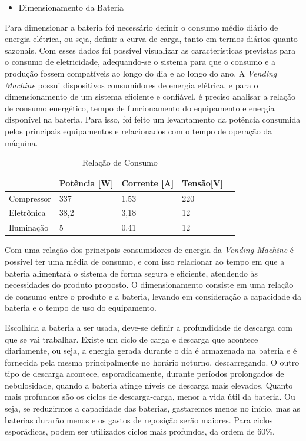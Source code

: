 \begin{itemize}
\item Dimensionamento da Bateria
\end{itemize}

Para dimensionar a bateria foi necessário definir o consumo médio diário de energia elétrica, ou seja, definir a curva de carga, tanto em termos diários quanto sazonais. Com esses dados foi possível visualizar as características previstas para o consumo de eletricidade, adequando-se o sistema para que o consumo e a produção fossem compatíveis ao longo do dia e ao longo do ano.
		A \textit{Vending Machine} possui dispositivos consumidores de energia elétrica, e para o dimensionamento de um sistema eficiente e confiável, é preciso analisar a relação de consumo energético, tempo de funcionamento do equipamento e energia disponível na bateria. Para isso, foi feito um levantamento da potência consumida pelos principais equipamentos e relacionados com o tempo de operação da máquina.

\begin{table}[]
\centering
\caption{Relação de Consumo}
\label{my-label}
\begin{tabular}{|l|l|l|l|l|}
\hline
           & Potência {[}W{]} & Corrente {[}A{]} & Tensão{[}V{]}  \\ \hline
Compressor & 337            & 1,53           & 220           \\ \hline
Eletrônica & 38,2                & 3,18                 &12         \\ \hline
Iluminação & 5            & 0,41            & 12          \\ \hline
\end{tabular}
\end{table}

        Com uma relação dos principais consumidores de energia da \textit{Vending Machine} é possível ter uma média de consumo, e com isso relacionar ao tempo em que a bateria alimentará o sistema de forma segura e eficiente, atendendo às necessidades do produto proposto. O dimensionamento consiste em uma relação de consumo entre o produto e a bateria, levando em consideração a capacidade da bateria e o tempo de uso do equipamento.

		Escolhida a bateria a ser usada, deve-se definir a profundidade de descarga com que se vai trabalhar. Existe um ciclo de carga e descarga que acontece diariamente, ou seja, a energia gerada durante o dia é armazenada na bateria e é fornecida pela mesma principalmente no horário noturno, descarregando. O outro tipo de descarga acontece, esporadicamente, durante períodos prolongados de nebulosidade, quando a bateria atinge níveis de descarga mais elevados.
Quanto mais profundos são os ciclos de descarga-carga, menor a vida útil da bateria. Ou seja, se reduzirmos a capacidade das baterias, gastaremos menos no início, mas as baterias durarão menos e os gastos de reposição serão maiores. Para ciclos esporádicos, podem ser utilizados ciclos mais profundos, da ordem de 60\%.

